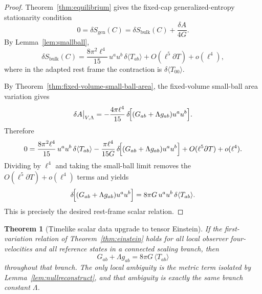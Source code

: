 \documentclass[11pt]{article}
\newtheorem{theorem}{Theorem}[section]
\begin{document}
\begin{proof}
Theorem~\ref{thm:equilibrium} gives the fixed-cap generalized-entropy stationarity condition
\[
0=\delta S_{\mathrm{gen}}(C)
=
\delta S_{\mathrm{bulk}}(C)+\frac{\delta A}{4G}.
\]
By Lemma~\ref{lem:smallball},
\[
\delta S_{\mathrm{bulk}}(C)
=
\frac{8\pi^2\ell^4}{15}\,u^a u^b\,\delta\langle T_{ab}\rangle
+O(\ell^5\partial T)+o(\ell^4),
\]
where in the adapted rest frame the contraction is $\delta\langle T_{00}\rangle$.

By Theorem~\ref{thm:fixed-volume-small-ball-area}, the fixed-volume small-ball area variation gives
\[
\delta A\big|_{V,\Lambda}
=
-\frac{4\pi\ell^4}{15}\,
\delta\!\Bigl[(G_{ab}+\Lambda g_{ab})u^a u^b\Bigr].
\]
Therefore
\[
0
=
\frac{8\pi^2\ell^4}{15}\,u^a u^b\,\delta\langle T_{ab}\rangle
-\frac{\pi\ell^4}{15G}\,
\delta\!\Bigl[(G_{ab}+\Lambda g_{ab})u^a u^b\Bigr]
+O(\ell^5\partial T)+o(\ell^4).
\]
Dividing by $\ell^4$ and taking the small-ball limit removes the $O(\ell^5\partial T)+o(\ell^4)$ terms and yields
\[
\delta\!\Bigl[(G_{ab}+\Lambda g_{ab})u^a u^b\Bigr]
=
8\pi G\,u^a u^b\,\delta\langle T_{ab}\rangle.
\]
This is precisely the desired rest-frame scalar relation.
\end{proof}

\begin{theorem}[Timelike scalar data upgrade to tensor Einstein]\label{cor:einstein}
If the first-variation relation of Theorem~\ref{thm:einstein} holds for all local observer four-velocities and all reference states in a connected scaling branch, then
\[
G_{ab}+\Lambda g_{ab}=8\pi G\,\langle T_{ab}\rangle
\]
throughout that branch. The only local ambiguity is the metric term isolated by Lemma~\ref{lem:nullreconstruct}, and that ambiguity is exactly the same branch constant $\Lambda$.
\end{theorem}
\end{document}

